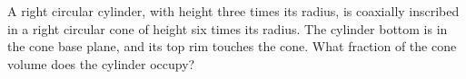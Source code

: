A right circular cylinder, with height three times its radius, is coaxially inscribed in a right circular cone of height six times its radius. The cylinder bottom is in the cone base plane, and its top rim touches the cone. What fraction of the cone volume does the cylinder occupy?
